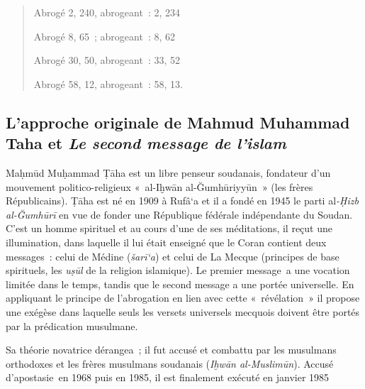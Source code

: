 \begin{quote}
Abrogé 2, 240, abrogeant~: 2, 234

Abrogé 8, 65~; abrogeant~: 8, 62

Abrogé 30, 50, abrogeant~: 33, 52

Abrogé 58, 12, abrogeant~: 58, 13.
\end{quote}


\subsection{ L'approche originale de Mahmud Muhammad Taha et \emph{Le
second message de l'islam}}

Maḥmūd Muḥammad Ṭāha est un libre penseur soudanais, fondateur d'un
mouvement politico-religieux «~al-Iḫwān al-Ğumhūriyyūn~» (les frères
Républicains). Ṭāha est né en 1909 à Rufâ`a et il a fondé en 1945 le
parti al\emph{-Ḥizb al-Ğumhūrī} en vue de fonder une République fédérale
indépendante du Soudan. C'est un homme spirituel et au cours d'une de
ses méditations, il reçut une illumination, dans laquelle il lui était
enseigné que le Coran contient deux messages~: celui de Médine
(\emph{šarī`a}) et celui de La Mecque (principes de base spirituels, les
\emph{uṣūl} de la religion islamique). Le premier message~a une vocation
limitée dans le temps, tandis que le second message a une portée
universelle. En appliquant le principe de l'abrogation en lien avec
cette «~révélation~» il propose une exégèse dans laquelle seuls les
versets universels mecquois doivent être portés par la prédication
musulmane.

Sa théorie novatrice dérangea~; il fut accusé et combattu par les
musulmans orthodoxes et les frères musulmans soudanais (\emph{Iḫwān
al-Muslimūn}). Accusé d'apostasie~en 1968 puis en 1985, il est
finalement exécuté en janvier 1985

